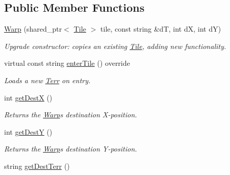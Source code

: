 \subsection*{Public Member Functions}
\begin{DoxyCompactItemize}
\item 
\hyperlink{class_warp_af3bd62dd04bfd66861475ed51e751ac4}{Warp} (shared\+\_\+ptr$<$ \hyperlink{class_tile}{Tile} $>$ tile, const string \&dT, int dX, int dY)\hypertarget{class_warp_af3bd62dd04bfd66861475ed51e751ac4}{}\label{class_warp_af3bd62dd04bfd66861475ed51e751ac4}

\begin{DoxyCompactList}\small\item\em Upgrade constructor\+: copies an existing \hyperlink{class_tile}{Tile}, adding new functionality. \end{DoxyCompactList}\item 
virtual const string \hyperlink{class_warp_a28e607e491d761c1baad786e911a2681}{enter\+Tile} () override\hypertarget{class_warp_a28e607e491d761c1baad786e911a2681}{}\label{class_warp_a28e607e491d761c1baad786e911a2681}

\begin{DoxyCompactList}\small\item\em Loads a new \hyperlink{class_terr}{Terr} on entry. \end{DoxyCompactList}\item 
int \hyperlink{class_warp_aaf9aa0b517287c71acb3ee383851084f}{get\+DestX} ()\hypertarget{class_warp_aaf9aa0b517287c71acb3ee383851084f}{}\label{class_warp_aaf9aa0b517287c71acb3ee383851084f}

\begin{DoxyCompactList}\small\item\em Returns the \hyperlink{class_warp}{Warp}\textquotesingle{}s destination X-\/position. \end{DoxyCompactList}\item 
int \hyperlink{class_warp_af31ad0229b4e694f945546746dc46e99}{get\+DestY} ()\hypertarget{class_warp_af31ad0229b4e694f945546746dc46e99}{}\label{class_warp_af31ad0229b4e694f945546746dc46e99}

\begin{DoxyCompactList}\small\item\em Returns the \hyperlink{class_warp}{Warp}\textquotesingle{}s destination Y-\/position. \end{DoxyCompactList}\item 
string \hyperlink{class_warp_a5c61204c5eafbd5dfa8a365c08257eec}{get\+Dest\+Terr} ()
\end{DoxyCompactItemize}
